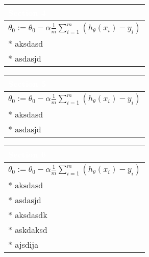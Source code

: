 \documentclass[a4paper,12pt,ngerman,fleqn]{article}
\newcommand{\mybox}[3]{
        \centering
        \begin{tabularx}{0.9\textwidth}{|X|}
            \hline
            \rowcolor{accent} 
            \textcolor{white}{\textbf{#1}} \\ \hline
            #2
            \\ \hline
            #3
            \\ \hline
        \end{tabularx}
    }
\begin{document}
    \begin{minipage}[t]{.51\textwidth}
        \vspace{1pt}
        \mybox
            {Section 4}
            {\( \theta_0 := \theta_0 - \alpha \frac{1}{m} \sum\limits_{i=1}^{m}(h_\theta(x_{i}) - y_{i}) \)}
            {
                * aksdasd \\
                * asdasjd
            }
        \newline
        \newline
        \newline
        \mybox
            {Section 5}
            {\( \theta_0 := \theta_0 - \alpha \frac{1}{m} \sum\limits_{i=1}^{m}(h_\theta(x_{i}) - y_{i}) \)}
            {
                * aksdasd \\
                * asdasjd
            }
        \newline
        \newline
        \newline
        \mybox
            {Section 6}
            {\( \theta_0 := \theta_0 - \alpha \frac{1}{m} \sum\limits_{i=1}^{m}(h_\theta(x_{i}) - y_{i}) \)}
            {
                * aksdasd \\
                * asdasjd \\
                * aksdasdk \\
                * askdaksd \\
                * ajsdija
            }
        \newline
    \end{minipage}
    
\end{document}
